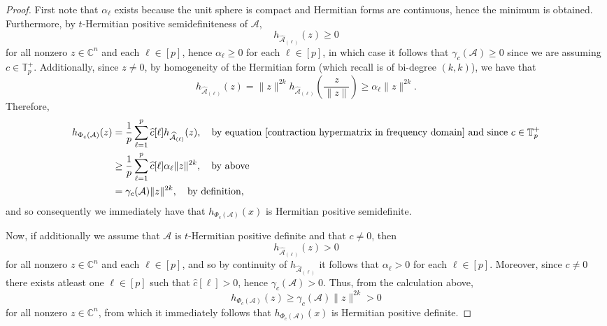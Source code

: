 \documentclass[11pt]{article}
\begin{document}
\begin{proof}
    First note that $\alpha_{\ell}$ exists because the unit sphere is compact and Hermitian forms are continuous, hence the minimum is obtained. Furthermore, by $t$-Hermitian positive semidefiniteness of $\mathcal{A}$, 
    \[h_{\widehat{\mathcal{A}}_{(\ell)}}(z) \geq 0\]
    for all nonzero $z\in \mathbb{C}^n$ and each $\ell\in [p]$, hence $\alpha_{\ell}\geq 0$ for each $\ell\in [p]$, in which case it follows that $\gamma_c(\mathcal{A})\geq 0$ since we are assuming $c\in \mathbb{T}_p^+$. Additionally, since $z\neq 0$, by homogeneity of the Hermitian form (which recall is of bi-degree $(k,k)$), we have that 
    \[h_{\widehat{\mathcal{A}}_{(\ell)}}(z) = \|z\|^{2k}h_{\widehat{\mathcal{A}}_{(\ell)}}\left(\frac{z}{\|z\|}\right) \geq \alpha_{\ell}\|z\|^{2k}.\]
    Therefore,  
    \begin{align*}
        h_{\Phi_c(\mathcal{A})}(z) &= \frac{1}{p}\sum\limits_{\ell=1}^p\widehat{c}[\ell]h_{\widehat{\mathcal{A}}_{(\ell)}}(z),\quad \text{by equation }\eqref{contraction hypermatrix in frequency domain}\text{ and since }c\in \mathbb{T}_p^+ \\
        &\geq \frac{1}{p}\sum\limits_{\ell=1}^p\widehat{c}[\ell]\alpha_{\ell}\|z\|^{2k},\quad \text{by above} \\
        &= \gamma_c(\mathcal{A})\|z\|^{2k},\quad \text{by definition},
    \end{align*}
    and so consequently we immediately have that $h_{\Phi_c(\mathcal{A})}(x)$ is Hermitian positive semidefinite. 
    
    Now, if additionally we assume that $\mathcal{A}$ is $t$-Hermitian positive definite and that $c\neq 0$, then 
    \[h_{\widehat{\mathcal{A}}_{(\ell)}}(z) > 0\]
    for all nonzero $z\in \mathbb{C}^n$ and each $\ell\in [p]$, and so by continuity of $h_{\widehat{\mathcal{A}}_{(\ell)}}$ it follows that $\alpha_{\ell} > 0$ for each $\ell\in [p]$. Moreover, since $c\neq 0$ there exists atleast one $\ell\in [p]$ such that $\widehat{c}[\ell] > 0$, hence $\gamma_c(\mathcal{A}) > 0$. Thus, from the calculation above, 
    \[h_{\Phi_c(\mathcal{A})}(z) \geq \gamma_c(\mathcal{A})\|z\|^{2k} > 0\]
    for all nonzero $z\in \mathbb{C}^n$, from which it immediately follows that $h_{\Phi_c(\mathcal{A})}(x)$ is Hermitian positive definite. 
\end{proof}
\end{document}
